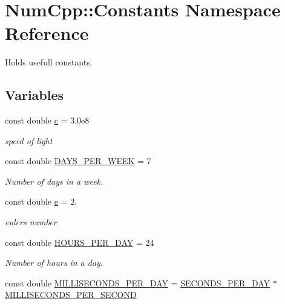 \hypertarget{namespace_num_cpp_1_1_constants}{}\section{Num\+Cpp\+:\+:Constants Namespace Reference}
\label{namespace_num_cpp_1_1_constants}


Holds usefull constants.  


\subsection*{Variables}
\begin{DoxyCompactItemize}
\item 
const double \mbox{\hyperlink{namespace_num_cpp_1_1_constants_a6d6d2ccb585a2c60d9ac23c93c86fdad}{c}} = 3.\+0e8
\begin{DoxyCompactList}\small\item\em speed of light \end{DoxyCompactList}\item 
const double \mbox{\hyperlink{namespace_num_cpp_1_1_constants_a3e3a9afde968528817a7c33d8e93169e}{D\+A\+Y\+S\+\_\+\+P\+E\+R\+\_\+\+W\+E\+EK}} = 7
\begin{DoxyCompactList}\small\item\em Number of days in a week. \end{DoxyCompactList}\item 
const double \mbox{\hyperlink{namespace_num_cpp_1_1_constants_a4e37443f31ad7709dc9a87d4f57c1771}{e}} = 2.
\begin{DoxyCompactList}\small\item\em eulers number \end{DoxyCompactList}\item 
const double \mbox{\hyperlink{namespace_num_cpp_1_1_constants_ae310d2531577c64d5fdea2da035cc1cd}{H\+O\+U\+R\+S\+\_\+\+P\+E\+R\+\_\+\+D\+AY}} = 24
\begin{DoxyCompactList}\small\item\em Number of hours in a day. \end{DoxyCompactList}\item 
const double \mbox{\hyperlink{namespace_num_cpp_1_1_constants_a504de0fa879e4238fa6d806c23f6fc50}{M\+I\+L\+L\+I\+S\+E\+C\+O\+N\+D\+S\+\_\+\+P\+E\+R\+\_\+\+D\+AY}} = \mbox{\hyperlink{namespace_num_cpp_1_1_constants_aa703dec8b51bafb3c563067d0453db60}{S\+E\+C\+O\+N\+D\+S\+\_\+\+P\+E\+R\+\_\+\+D\+AY}} $\ast$ \mbox{\hyperlink{namespace_num_cpp_1_1_constants_af6ba5707b763ac1ff3832e31bedd6241}{M\+I\+L\+L\+I\+S\+E\+C\+O\+N\+D\+S\+\_\+\+P\+E\+R\+\_\+\+S\+E\+C\+O\+ND}}

\end{DoxyCompactItemize}
